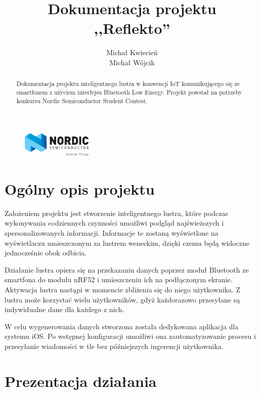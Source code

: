 \documentclass[a4paper,11pt]{article}
\begin{document}
\title{Dokumentacja projektu \\ \textbf{,,Reflekto'' } }
\author{Michał Kwiecień \\ Michał Wójcik}
\maketitle

\begin{abstract}
Dokumentacja projektu inteligentnego lustra w konwencji IoT komunikującego się ze smartfonem z użyciem interfejsu Bluetooth Low Energy. Projekt powstał na potrzeby konkursu Nordic Semiconductor Student Contest. 
\end{abstract}

\begin{figure}
	\includegraphics[width=0.3\textwidth,center]{logo_nordic.png}
\end{figure}

\cleardoublepage
\tableofcontents
\clearpage

\section{Ogólny opis projektu}

Założeniem projektu jest stworzenie inteligentnego lustra, które podczas wykonywania codziennych czynności umożliwi podgląd najświeższych i spersonalizowanych informacji. Informacje te zostaną wyświetlone na wyświetlaczu umieszczonym za lustrem weneckim, dzięki czemu będą widoczne jednocześnie obok odbicia. 

Działanie lustra opiera się na przekazaniu danych poprzez moduł Bluetooth ze smartfona do modułu nRF52 i umieszczeniu ich na podłączonym ekranie. Aktywacja lustra nastąpi w momencie zbliżenia się do niego użytkownika. Z lustra może korzystać wielu użytkowników, gdyż każdorazowo przesyłane są indywidualne dane dla każdego z nich. 

W celu wygenerowania danych stworzona została dedykowana aplikacja dla systemu iOS. Po wstępnej konfiguracji umożliwi ona zautomatyzowanie procesu i przesyłanie wiadomości w tle bez późniejszych ingerencji użytkownika.


\section{Prezentacja działania}
\end{document}
